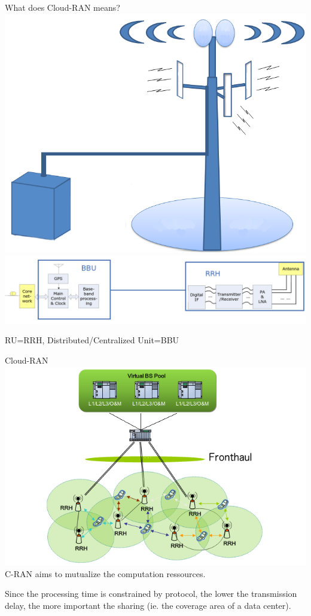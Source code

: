 \documentclass[10 pt]{beamer}
\begin{document}
\begin{frame}{What does Cloud-RAN means?}
  \centering
  \includegraphics[scale=0.2]{cloudbts.png}\\
  \includegraphics[scale=0.175]{BBURRH.png}
  
   RU=RRH, Distributed/Centralized Unit=BBU
\end{frame}



\begin{frame}{Cloud-RAN}
  \centering
  \includegraphics[scale=0.3]{CRAN}\\
  \vspace{0.5cm}
  \pause
  C-RAN aims to mutualize the computation ressources.
  
  \pause

  Since the processing time is constrained by protocol, the lower the transmission delay, the more important the sharing (ie. the coverage area of a data center).
  
  
\end{frame}
\end{document}
